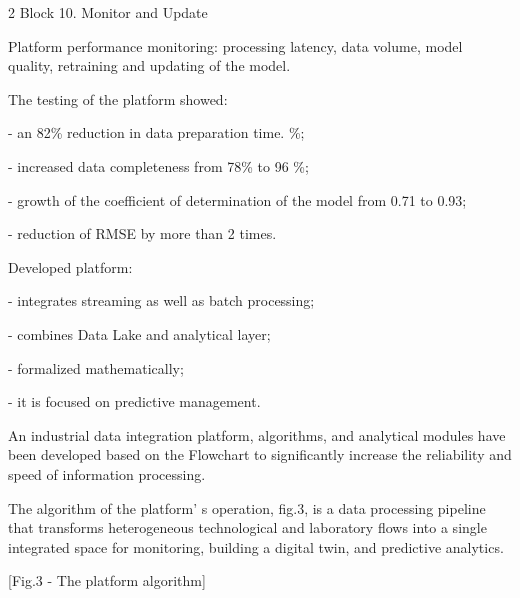 \begin{multicols}{2}
Block 10. Monitor and Update

Platform performance monitoring: processing latency, data volume, model
quality, retraining and updating of the model.

The testing of the platform showed:

- an 82\% reduction in data preparation time. \%;

- increased data completeness from 78\% to 96 \%;

- growth of the coefficient of determination of the model from 0.71 to
0.93;

- reduction of RMSE by more than 2 times.

Developed platform:

- integrates streaming as well as batch processing;

- combines Data Lake and analytical layer;

- formalized mathematically;

- it is focused on predictive management.

An industrial data integration platform, algorithms, and analytical
modules have been developed based on the Flowchart to significantly
increase the reliability and speed of information processing.

The algorithm of the platform' s operation, fig.3, is a
data processing pipeline that transforms heterogeneous technological and
laboratory flows into a single integrated space for monitoring, building
a digital twin, and predictive analytics.
\end{multicols}

[Fig.3 - The platform algorithm]


